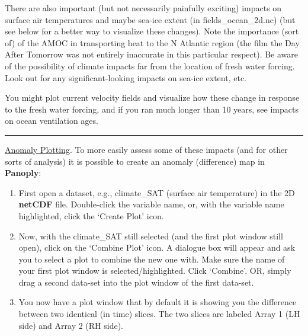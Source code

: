There are also important (but not necessarily painfully exciting) impacts on surface air temperatures and maybe sea-ice extent (in \textsf{\footnotesize fields\_ocean\_2d.nc}) (but see below for a better way to visualize these changes). Note the importance (sort of) of the AMOC in transporting heat to the N Atlantic region (the film the Day After Tomorrow was not entirely inaccurate in this particular respect). Be aware of the possibility of climate impacts far from the location of fresh water forcing. Look out for any significant-looking impacts on sea-ice extent, etc.

You might plot current velocity fields and visualize how these change in response to the fresh water forcing, and if you ran much longer than 10 years, see impacts on ocean ventilation ages.

\vspace{1mm}\noindent\rule{4cm}{0.5pt}\vspace{2mm}

\noindent \uline{Anomaly Plotting}. To more easily assess some of these impacts (and for other sorts of analysis) it is possible to create an anomaly (difference) map in \textbf{Panoply}:

\vspace{1mm}
\begin{enumerate}[noitemsep]
\vspace{1mm}
\item  First open a dataset, e.g., \textsf{\footnotesize climate\_SAT} (surface air temperature) in the 2D \textbf{netCDF} file. Double-click the variable name, or, with the variable name highlighted, click the ‘Create Plot’ icon.
\vspace{-3mm}
\item Now, with the \textsf{\footnotesize climate\_SAT} still selected (and the first plot window still open), click on the \textsf{\footnotesize ‘Combine Plot’} icon. A dialogue box will appear and ask you to select a plot to combine the new one with. Make sure the name of your first plot window is selected/highlighted. Click \textsf{\footnotesize ‘Combine’}. OR, simply drag a second data-set into the plot window of the first data-set.
\vspace{1mm}
\item You now have a plot window that by default it is showing you the difference between two identical (in time) slices. The two slices are labeled Array 1 (LH side) and Array 2 (RH side).
\end{enumerate}
\vspace{1mm}

